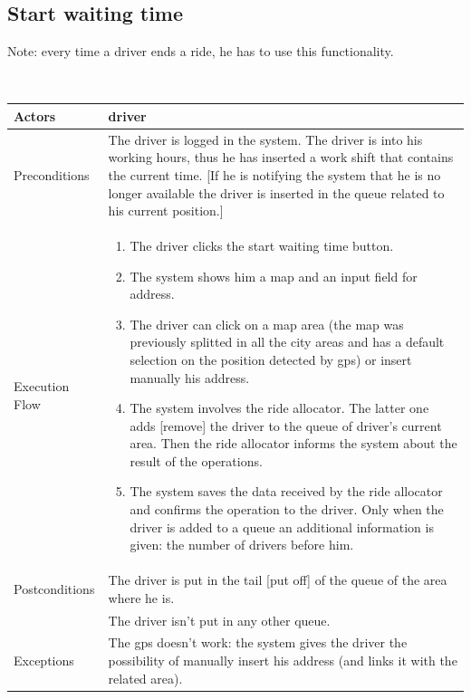 \subsection{Start waiting time}
\label{requirements:StartWaitingTime}
\begin{footnotesize}
	Note: every time a driver ends a ride, he has to use this functionality.
\end{footnotesize}\\
\begin{tabular}{lp{8cm}}
	\hline 
	Actors & \Gls{driver}  \\ \hline
	Preconditions & The driver is logged in the system. The driver is into his working hours, thus he has inserted a work shift that contains the current time. [If he is notifying the system that he is no longer available the driver is inserted in the queue related to his current position.] \\ \hline
	Execution Flow &  \begin{enumerate}
					\item The driver clicks the start waiting time button.
					\item The system shows him a \gls{map} and an input field for address.
					\item The driver can click on a \gls{map} area (the \gls{map} was previously splitted in all the city areas and has a default selection on the position detected by \gls{gps}) or insert manually his address.
					\item The system involves the ride allocator. The latter one adds [remove] the driver to the queue of driver's current area. Then the ride allocator informs the system about the result of the operations.
					\item The system saves the data received by the ride allocator and confirms the operation to the driver. Only when the driver is added to a queue an additional information is given: the number of drivers before him.
				\end{enumerate}
	 \\ \hline
	 Postconditions & The driver is put in the tail [put off] of the queue of the area where he is.\\
	 				& The driver isn't put in any other queue. \\ \hline
	 Exceptions &  The \gls{gps} doesn't work: the system gives the driver the possibility of manually insert his address (and links it with the related area). \\ \hline
\end{tabular}

